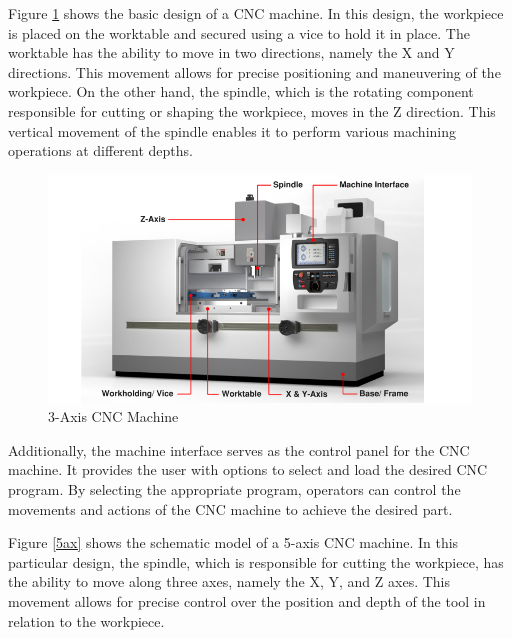 Figure \ref{3ax} shows the basic design of a \acrshort{CNC} machine. In this design, the workpiece is placed on the worktable and secured using a vice to hold it in place. The worktable has the ability to move in two directions, namely the X and Y directions. This movement allows for precise positioning and maneuvering of the workpiece. On the other hand, the spindle, which is the rotating component responsible for cutting or shaping the workpiece, moves in the Z direction. This vertical movement of the spindle enables it to perform various machining operations at different depths.



 
\begin{figure}[H]
	\centerline{\includegraphics[scale=.6]{figures/basicCNC.jpg}}
	\caption{3-Axis CNC Machine~\cite{3ax}}
	\label{3ax}
\end{figure}
\newpage
Additionally, the machine interface serves as the control panel for the \acrshort{CNC} machine. It provides the user with options to select and load the desired \acrshort{CNC} program. By selecting the appropriate program, operators can control the movements and actions of the \acrshort{CNC} machine to achieve the desired part.


Figure \ref{5ax} shows the schematic model of a 5-axis \acrshort{CNC} machine. In this particular design, the spindle, which is responsible for cutting the workpiece, has the ability to move along three axes, namely the X, Y, and Z axes. This movement allows for precise control over the position and depth of the tool in relation to the workpiece.

